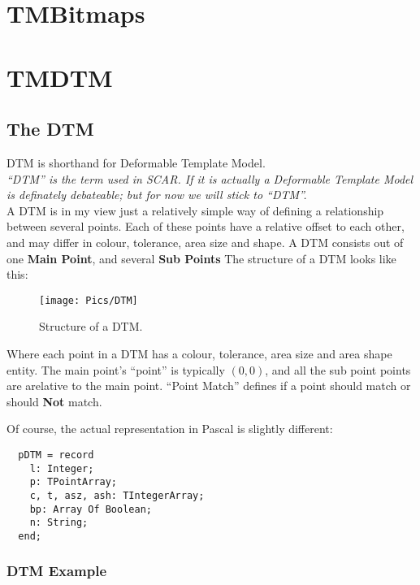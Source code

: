 \documentclass[a4paper, 10pt]{report} %
\begin{document}


\section{TMBitmaps}

\section{TMDTM}

\subsection{The DTM}

DTM is shorthand for Deformable Template Model. \\

\emph{``DTM'' is the term used in SCAR. If it is actually a Deformable Template
Model is definately debateable; but for now we will stick to ``DTM''.} \\

A DTM is in my view just a relatively simple way of defining a relationship
between several points. Each of these points have a relative offset to each
other, and may differ in colour, tolerance, area size and shape.
A DTM consists out of one \textbf{Main Point}, and several \textbf{Sub Points}
The structure of a DTM looks like this:

\begin{figure}[ht]
    \texttt{[image: Pics/DTM]}
    \caption{Structure of a DTM.}
\end{figure}

Where each point in a DTM has a colour, tolerance, area size and area shape
entity. The main point's ``point'' is typically $ (0, 0) $, and all the
sub point points are arelative to the main point. ``Point Match'' defines if a point should match or should \textbf{Not} match.

Of course, the actual representation in Pascal is slightly different:


\begin{lstlisting}
  pDTM = record
    l: Integer;
    p: TPointArray;
    c, t, asz, ash: TIntegerArray;
    bp: Array Of Boolean;
    n: String;
  end;
\end{lstlisting}

\subsubsection{DTM Example}
\end{document}
